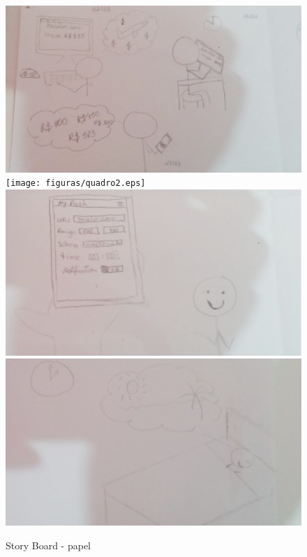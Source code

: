 \begin{figure}[h]
	\centering
	\label{fig01}
		\includegraphics[keepaspectratio=true,scale=0.3]{figuras/quadro1.eps}
		\texttt{[image: figuras/quadro2.eps]}
		\includegraphics[keepaspectratio=true,scale=0.3]{figuras/quadro3.eps}
		\includegraphics[keepaspectratio=true,scale=0.3]{figuras/quadro4.eps}
	\caption{Story Board - papel}
\end{figure}

